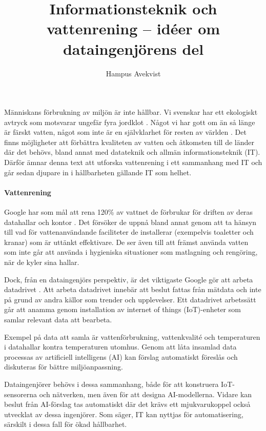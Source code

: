 \documentclass[12pt]{article}
\title{Informationsteknik och vattenrening -- idéer om dataingenjörens del }
\author{Hampus Avekvist}
\begin{document}
\maketitle

Människans förbrukning av miljön är inte hållbar. Vi svenskar
har ett ekologiskt avtryck som motsvarar ungefär fyra jordklot
\cite[262-263]{gullikssonHolmgren}. Något vi har gott om än så
länge är färskt vatten, något som inte är en självklarhet för
resten av världen \cite[276]{gullikssonHolmgren}. Det finns
möjligheter att förbättra kvaliteten av vatten och åtkomsten
till de länder där det behövs, bland annat med datateknik och
allmän informationsteknik (IT). Därför ämnar denna text att
utforska vattenrening i ett sammanhang med IT och går sedan
djupare in i hållbarheten gällande IT som helhet.

\paragraph{Vattenrening}

Google har som mål att rena 120\% av vattnet de förbrukar för
driften av deras datahallar och kontor
\cite{googleWaterStewardship}. Det försöker de uppnå bland annat
genom att ta hänsyn till vad för vattenanvändande faciliteter de
installerar (exempelvis toaletter och kranar) som är uttänkt
effektivare. De ser även till att främst använda vatten som inte
går att använda i hygieniska situationer som matlagning och
rengöring, när de kyler sina hallar. 

Dock, från en dataingenjörs perspektiv, är det viktigaste Google
gör att arbeta datadrivet \cite{googleWaterStewardship}. Att
arbeta datadrivet innebär att beslut fattas från mätdata och inte
på grund av andra källor som trender och upplevelser. Ett
datadrivet arbetssätt går att anamma genom installation av
internet of things (IoT)-enheter som samlar relevant data att
bearbeta.

Exempel på data att samla är vattenförbrukning, vattenkvalité och
temperaturen i datahallar kontra temperaturen utomhus. Genom att
låta insamlad data processas av artificiell intelligens (AI) kan
förslag automatiskt föreslås och diskuteras för bättre
miljöanpassning. 

Dataingenjörer behövs i dessa sammanhang, både för att konstruera
IoT-sensorerna och nätverken, men även för att designa
AI-modellerna. Vidare kan beslut från AI-förslag tas automatiskt
där det krävs ett mjukvarukoppel också utvecklat av dessa
ingenjörer. Som \cite[282]{gullikssonHolmgren} säger, IT kan
nyttjas för automatisering, särskilt i dessa fall för ökad
hållbarhet.
\end{document}
